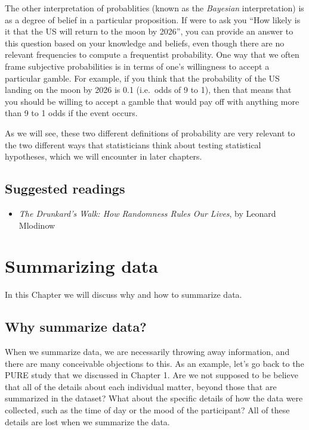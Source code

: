 \documentclass[]{book}
\providecommand{\tightlist}{%
  \setlength{\itemsep}{0pt}\setlength{\parskip}{0pt}}
\theoremstyle{definition}
\theoremstyle{definition}
\theoremstyle{definition}
\theoremstyle{remark}
\begin{document}
The other interpretation of probablities (known as the \emph{Bayesian}
interpretation) is as a degree of belief in a particular proposition. If
were to ask you ``How likely is it that the US will return to the moon
by 2026'', you can provide an answer to this question based on your
knowledge and beliefs, even though there are no relevant frequencies to
compute a frequentist probability. One way that we often frame
subjective probabilities is in terms of one's willingness to accept a
particular gamble. For example, if you think that the probability of the
US landing on the moon by 2026 is 0.1 (i.e.~odds of 9 to 1), then that
means that you should be willing to accept a gamble that would pay off
with anything more than 9 to 1 odds if the event occurs.

As we will see, these two different definitions of probability are very
relevant to the two different ways that statisticians think about
testing statistical hypotheses, which we will encounter in later
chapters.

\section{Suggested readings}\label{suggested-readings-2}

\begin{itemize}
\tightlist
\item
  \emph{The Drunkard's Walk: How Randomness Rules Our Lives}, by Leonard
  Mlodinow
\end{itemize}

\chapter{Summarizing data}\label{summarizing-data}

In this Chapter we will discuss why and how to summarize data.

\section{Why summarize data?}\label{why-summarize-data}

When we summarize data, we are necessarily throwing away information,
and there are many conceivable objections to this. As an example, let's
go back to the PURE study that we discussed in Chapter 1. Are we not
supposed to be believe that all of the details about each individual
matter, beyond those that are summarized in the dataset? What about the
specific details of how the data were collected, such as the time of day
or the mood of the participant? All of these details are lost when we
summarize the data.
\end{document}
